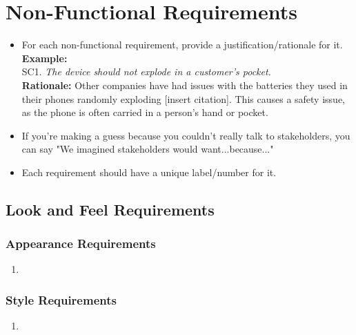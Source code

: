 \documentclass[]{article}
\begin{document}

\section{Non-Functional Requirements}
\label{sec:non-functional_requirements}


\begin{itemize}
	\item For each non-functional requirement, provide a justification/rationale for it.\\
	{\bf Example:} \\
	SC1. \emph{The device should not explode in a customer’s pocket.}\\
	{\bf Rationale:} Other companies have had issues with the batteries they used in their phones randomly exploding [insert citation]. This causes a safety issue, as the phone is often carried in a person's hand or pocket.	
	\item If you're making a guess because you couldn't really talk to stakeholders, you can say "We imagined stakeholders would want...because..."
	\item Each requirement should have a unique label/number for it.
\end{itemize}

\subsection{Look and Feel Requirements}
\label{sub:look_and_feel_requirements}

\subsubsection{Appearance Requirements}
\label{ssub:appearance_requirements}
\begin{enumerate}[{LF-A}1. ]
	\item 
\end{enumerate}

\subsubsection{Style Requirements}
\label{ssub:style_requirements}
\begin{enumerate}[{LF-S}1. ]
	\item 
\end{enumerate}
\end{document}
